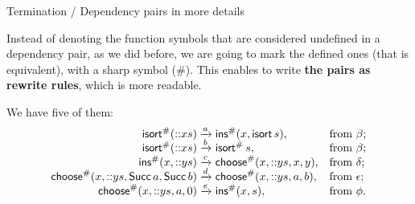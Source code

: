 %
\begin{frame}{Termination / Dependency pairs in more details}

  Instead of denoting the function symbols that are considered
  undefined in a dependency pair, as we did before, we are going to
  mark the defined ones (that is equivalent), with a sharp symbol
  (\#). This enables to write \textbf{the pairs as rewrite rules},
  which is more readable.

  \bigskip

  We have five of them:
  \begin{equation*}
    \begin{array}{r@{\;}c@{\;}ll}
        \fun{isort}^\#(\cons{x}{s})
      & \smashedrightarrow{a}
      & \fun{ins}^\#(x, \fun{isort}\, s), & \text{from \(\beta\)};\\
        \fun{isort}^\#(\cons{x}{s})
      & \smashedrightarrow{b}
      & \fun{isort}^\#\, s, & \text{from \(\beta\)};\\
        \fun{ins}^\#(x,\cons{y}{s})
      & \smashedrightarrow{c}
      & \fun{choose}^\#(x, \cons{y}{s}, x, y), & \text{from \(\delta\)};\\
        \fun{choose}^\#(x, \cons{y}{s}, \fun{Succ}\,a, \fun{Succ}\,b)
      & \smashedrightarrow{d}
      & \fun{choose}^\#(x, \cons{y}{s}, a, b), & \text{from \(\epsilon\)};\\
        \fun{choose}^\#(x, \cons{y}{s}, a, 0)
      & \smashedrightarrow{e}
      & \fun{ins}^\#(x,s), & \text{from \(\phi\)}.
    \end{array}
  \end{equation*}

\end{frame}

